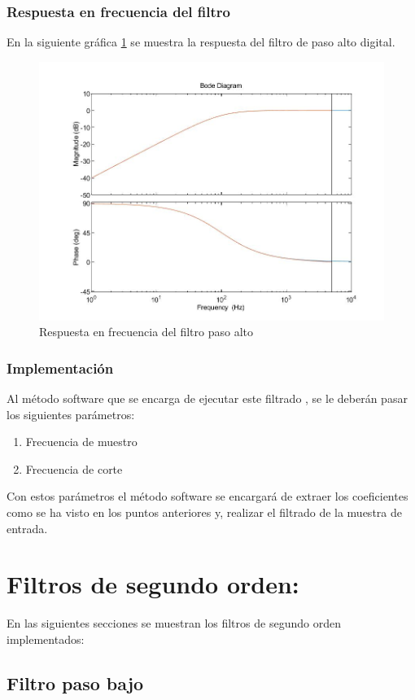 \documentclass[titlepage]{article}
\begin{document}
\subsubsection{Respuesta en frecuencia del filtro}
En la siguiente gráfica \ref{fig:filtro_paso_alto_primer_orden} se muestra la respuesta del filtro de paso alto digital.
\begin{figure}[H]
  \centering
	\includegraphics[scale=0.4]{filtro_paso_alto_primer_orden}
  \caption{Respuesta en frecuencia del filtro paso alto}
  \label{fig:filtro_paso_alto_primer_orden}
\end{figure}
\subsubsection{Implementación}
Al método software que se encarga de ejecutar este filtrado , se le deberán pasar los siguientes parámetros:
\begin{enumerate}
\item Frecuencia de muestro 
\item Frecuencia de corte
\end{enumerate}
Con estos parámetros el método software se encargará de extraer los coeficientes como se ha visto en los puntos anteriores y, realizar el filtrado de la muestra de entrada.


\section{Filtros de segundo orden:}
En las siguientes secciones se muestran los filtros de segundo orden implementados:
\subsection{Filtro paso bajo}
\end{document}
